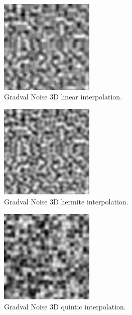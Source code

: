 \begin{figure}[h]
\centering
\includegraphics[width=0.4\textwidth]{out/noise_functions/gradval_noise3D_linearInterp.png}
\caption{Gradval Noise 3D linear interpolation.}
\label{fig:gradval_noise3D_linearInterp}
\end{figure}

\begin{figure}[h]
\centering
\includegraphics[width=0.4\textwidth]{out/noise_functions/gradval_noise3D_hermiteInterp.png}
\caption{Gradval Noise 3D hermite interpolation.}
\label{fig:gradval_noise3D_hermiteInterp}
\end{figure}

\begin{figure}[h]
\centering
\includegraphics[width=0.4\textwidth]{out/noise_functions/gradval_noise2D_quinticInterp.png}
\caption{Gradval Noise 3D quintic interpolation.}
\label{fig:gradval_noise2D_quinticInterp}
\end{figure}


